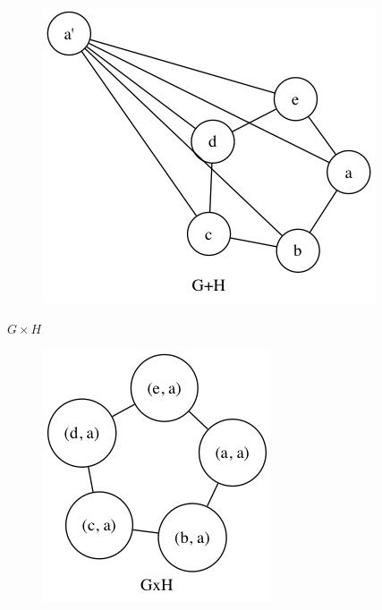 \begin{enumerate}[(a)]
\begin{figure}[H]
    \includegraphics[scale=0.5]{115/115cGH.png}
    \end{figure}
    $G \times H$
    \begin{figure}[H]
    \centering
    \includegraphics[scale=0.5]{115/115cGH2.png}
    \end{figure}
\end{enumerate}
